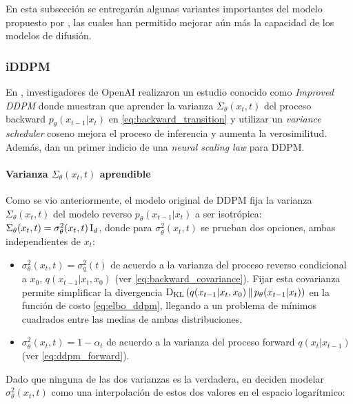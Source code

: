 En esta subsección se entregarán algunas variantes importantes del modelo propuesto por \cite{ho2020denoising}, las cuales han permitido mejorar aún más la capacidad de los modelos de difusión.

\subsubsection{iDDPM}

En \cite{nichol2021improved}, investigadores de OpenAI realizaron un estudio conocido como \textit{Improved DDPM} donde muestran que aprender la varianza $\Sigma_\theta(x_t,t)$ del proceso backward $p_\theta(x_{t-1}|x_t)$ en \eqref{eq:backward_transition} y utilizar un \textit{variance scheduler} coseno mejora el proceso de inferencia y aumenta la verosimilitud. Además, dan un primer indicio de una \textit{neural scaling law} para DDPM.

\paragraph{Varianza \texorpdfstring{$\Sigma_\theta(x_t,t)$}{} aprendible}

Como se vio anteriormente, el modelo original de DDPM \cite{ho2020denoising} fija la varianza $\Sigma_\theta(x_t,t)$ del modelo reverso $p_\theta(x_{t-1}|x_{t})$ a ser isotrópica: $\Sigma_\theta(x_t,t) = \sigma^2_\theta(x_t,t) \operatorname{I}_{d}$, donde para $\sigma^2_\theta(x_t,t)$ se prueban dos opciones, ambas independientes de $x_t$:

\begin{itemize}
    \item $\sigma^2_\theta(x_t,t) = \sigma_q^2(t)$ de acuerdo a la varianza del proceso reverso condicional a $x_0$, $q(x_{t-1}|x_t,x_0)$ (ver \eqref{eq:backward_covariance}). Fijar esta covarianza permite simplificar la divergencia $\operatorname{D_{KL}}\left(q(x_{t-1}|x_t,x_0)\,\|\,p_\theta(x_{t-1}|x_t)\right)$ en la función de costo \eqref{eq:elbo_ddpm}, llegando a un problema de mínimos cuadrados entre las medias de ambas distribuciones.
    \item $\sigma^2_\theta(x_t,t) = 1-\alpha_t$ de acuerdo a la varianza del proceso forward $q(x_t|x_{t-1})$ (ver \eqref{eq:ddpm_forward}).
\end{itemize}

Dado que ninguna de las dos varianzas es la verdadera, en \cite{nichol2021improved} deciden modelar $\sigma^2_\theta(x_t,t)$ como una interpolación de estos dos valores en el espacio logarítmico:

